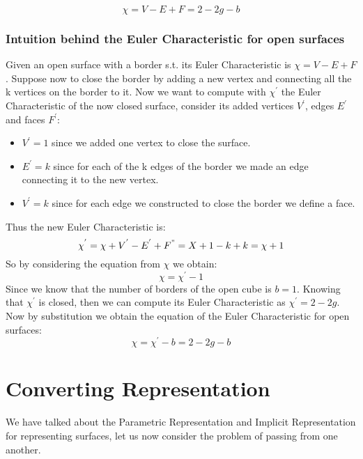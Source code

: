 \begin{equation*}
    \chi = V - E + F = 2 - 2g - b
\end{equation*}

\subsubsection{Intuition behind the Euler Characteristic for open surfaces}
Given an open surface with a border s.t. its Euler Characteristic is $\chi = V - E + F$. Suppose now to close the border by adding a new vertex and connecting all the k vertices on the border to it. Now we want to compute  with $\chi^{'}$ the Euler Characteristic of the now closed surface, consider its added vertices $V^{'}$, edges $E^{'}$ and faces $F^{'}$:
\begin{itemize}
    \item $V^{'} = 1$ since we added one vertex to close the surface.
    \item $E^{'} = k$ since for each of the k edges of the border we made an edge connecting it to the new vertex.
    \item $V^{'} = k$ since for each edge we constructed to close the border we define a face.
\end{itemize}

Thus the new Euler Characteristic is:
\begin{equation*}
    \chi^{'} = \chi + V^{'} - E^{'} + F^{"} = X + 1 - k + k = \chi + 1
\end{equation*}
So by considering the equation from $\chi$ we obtain:
\begin{equation*}
    \chi = \chi^{'} - 1
\end{equation*}
Since we know that the number of borders of the open cube is $b = 1$. Knowing that $\chi^{'}$ is closed, then we can compute its Euler Characteristic as $\chi^{'} = 2 - 2g$. Now by substitution we obtain the equation of the Euler Characteristic for open surfaces:
\begin{equation*}
    \chi = \chi^{'} - b = 2 - 2g - b
\end{equation*}

\section{Converting Representation}
We have talked about the Parametric Representation and Implicit Representation for representing surfaces, let us now consider the problem of passing from one another.

